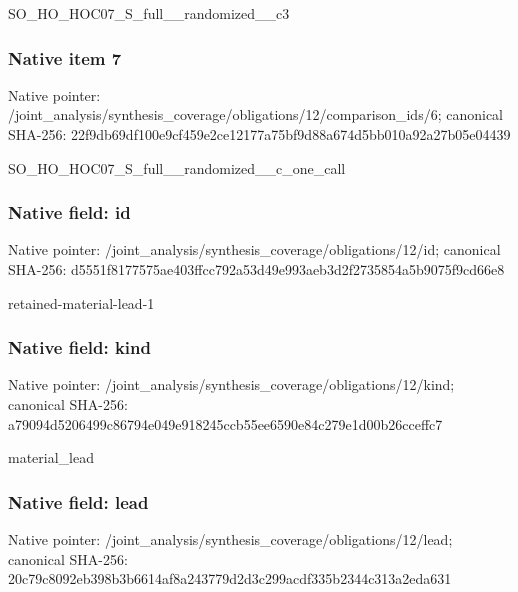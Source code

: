 \documentclass[10pt,a4paper]{article}
\begin{document}
\begingroup\raggedright\sloppy SO\_\allowbreak{}HO\_\allowbreak{}HOC07\_\allowbreak{}S\_\allowbreak{}full\_\allowbreak{}\_\allowbreak{}randomized\_\allowbreak{}\_\allowbreak{}c3\par\endgroup

\subsubsection{Native item 7}
Native pointer: /joint\_\allowbreak{}analysis/synthesis\_\allowbreak{}coverage/obligations/12/comparison\_\allowbreak{}ids/6; canonical SHA-256: 22f9db69df100e9cf459e2ce12177a75bf9d88a674d5bb010a92a27b05e04439

\begingroup\raggedright\sloppy SO\_\allowbreak{}HO\_\allowbreak{}HOC07\_\allowbreak{}S\_\allowbreak{}full\_\allowbreak{}\_\allowbreak{}randomized\_\allowbreak{}\_\allowbreak{}c\_\allowbreak{}one\_\allowbreak{}call\par\endgroup

\subsubsection{Native field: id}
Native pointer: /joint\_\allowbreak{}analysis/synthesis\_\allowbreak{}coverage/obligations/12/id; canonical SHA-256: d5551f8177575ae403ffcc792a53d49e993aeb3d2f2735854a5b9075f9cd66e8

\begingroup\raggedright\sloppy retained-material-lead-1\par\endgroup

\subsubsection{Native field: kind}
Native pointer: /joint\_\allowbreak{}analysis/synthesis\_\allowbreak{}coverage/obligations/12/kind; canonical SHA-256: a79094d5206499c86794e049e918245ccb55ee6590e84c279e1d00b26cceffc7

\begingroup\raggedright\sloppy material\_\allowbreak{}lead\par\endgroup

\subsubsection{Native field: lead}
Native pointer: /joint\_\allowbreak{}analysis/synthesis\_\allowbreak{}coverage/obligations/12/lead; canonical SHA-256: 20c79c8092eb398b3b6614af8a243779d2d3c299acdf335b2344c313a2eda631
\end{document}
